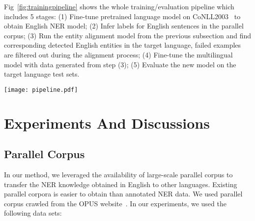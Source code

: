 \documentclass[11pt]{article}
\begin{document}
Fig~\ref{fig:trainingpipeline} shows the whole training/evaluation pipeline which includes 5 stages: (1) Fine-tune pretrained language model on CoNLL2003~\cite{conll2003ner} to obtain English NER model; (2) Infer labels for English sentences in the parallel corpus; (3) Run the entity alignment model from the previous subsection and find corresponding detected English entities in the target language, failed examples are filtered out during the alignment process; (4) Fine-tune the multilingual model with data generated from step (3); (5) Evaluate the new model on the target language test sets.

\begin{figure*}[t]
	\centering
	\texttt{[image: pipeline.pdf]}
	\caption{\textbf{Training Pipeline Diagram}. Yellow pages represent English documents while light blue pages represent German documents. Step 1 and 5 used original CoNLL data for train and test respectively; step 2, 3, and 4 used machine translation data from OPUS website. Pretrained model is either mBert or XLM-R. The final model was first fine-tuned on English NER data set then fine-tuned on target language pseudo-labeled NER data set.}
	\label{fig:trainingpipeline}
\end{figure*}


\section{Experiments And Discussions}
\label{section:experiment}

\subsection{Parallel Corpus}
In our method, we leveraged the availability of large-scale parallel corpus to transfer the NER knowledge obtained in English to other languages. Existing parallel corpora is easier to obtain than annotated NER data. We used parallel corpus crawled from the OPUS website~\cite{TIEDEMANN12}. In our experiments, we used the following data sets:
\end{document}
